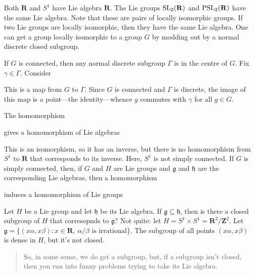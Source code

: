 \documentclass [11 pt, twoside] {article}
\begin{document}
\begin{example}[ ]\label{}\text{}
Both $\mathbf{R}$ and $S^{1}$ have Lie algebra $\mathbf{R}$.
The Lie groups $\operatorname{SL}_{2}(\mathbf{R})$ and $\operatorname{PSL}_{2}(\mathbf{R})$ have the same Lie algebra. 
Note that these are pairs of locally isomorphic groups. 
If two Lie groups are locally isomorphic, then they have the same Lie algebra.
One can get a group locally isomorphic to a group $G$ by modding out by a normal discrete closed subgroup.

If $G$ is connected, then any normal discrete subgroup $\Gamma$ is in the centre of $G$. Fix $\gamma\in \Gamma$. Consider 
This is a map from $G$ to $\Gamma$.
Since $G$ is connected and $\Gamma$ is discrete, the image of this map is a point---the identity---whence $g$ commutes with $\gamma$ for all $g\in G$.
\end{example}

\begin{example}[ ]\label{}\text{}
The homomorphism 
gives a homomorphism of Lie algebras 
This is an isomorphism, so it has an inverse, but there is no homomorphism from $S^{1}$ to $\mathbf{R}$ that corresponds to its inverse.
Here, $S^{1}$ is not simply connected. If $G$ is simply connected, then, if $G$ and $H$ are Lie groups and $\mathfrak{g}$ and $\mathfrak{h}$ are the corresponding Lie algebras, then a homomorphism 
induces a homomorphism of Lie groups 
\end{example}

\begin{example}[ ]\label{}\text{}
Let $H$ be a Lie group and let $\mathfrak{h}$ be its Lie algebra. 
If $\mathfrak{g}\subseteq \mathfrak{h}$, then is there a closed subgroup of $H$ that corresopnds to $\mathfrak{g}$?
Not quite: let $H = S^{1}\times S^{1} = \mathbf{R}^{2}/\mathbf{Z}^{2}$.
Let $\mathfrak{g} = \{(x\alpha,x\beta): x\in  \mathbf{R},\ \textrm{$\alpha/\beta$ is irrational}\}$.
The subgroup of all points $(x\alpha,x\beta)$ is dense in $H$, but it's not closed.
\begin{quote}
	\small
	So, in some sense, we do get a subgroup, but, if a subgroup isn't closed, then you run into funny problems trying to take its Lie algebra.
\end{quote}
\end{example}
\end{document}

